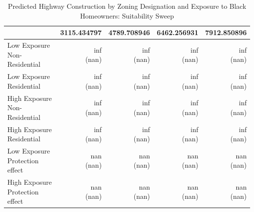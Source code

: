 \begin{table}[h]
\centering
\caption{Predicted Highway Construction by Zoning Designation and Exposure to Black Homeowners: Suitability Sweep}
\label{tab:predicted_outcomes_black_homeowners_sweep}
\begin{threeparttable}
\begin{tabular*}{0.6\textwidth}{@{\extracolsep{\fill}}l*{4}{r}}
\toprule
 & 3115.434797 & 4789.708946 & 6462.256931 & 7912.850896 \\
\midrule
Low Exposure Non-Residential & \makecell[tr]{inf \\ (nan)} & \makecell[tr]{inf \\ (nan)} & \makecell[tr]{inf \\ (nan)} & \makecell[tr]{inf \\ (nan)} \\
Low Exposure Residential & \makecell[tr]{inf \\ (nan)} & \makecell[tr]{inf \\ (nan)} & \makecell[tr]{inf \\ (nan)} & \makecell[tr]{inf \\ (nan)} \\
High Exposure Non-Residential & \makecell[tr]{inf \\ (nan)} & \makecell[tr]{inf \\ (nan)} & \makecell[tr]{inf \\ (nan)} & \makecell[tr]{inf \\ (nan)} \\
High Exposure Residential & \makecell[tr]{inf \\ (nan)} & \makecell[tr]{inf \\ (nan)} & \makecell[tr]{inf \\ (nan)} & \makecell[tr]{inf \\ (nan)} \\
Low Exposure Protection effect & \makecell[tr]{nan \\ (nan)} & \makecell[tr]{nan \\ (nan)} & \makecell[tr]{nan \\ (nan)} & \makecell[tr]{nan \\ (nan)} \\
High Exposure Protection effect & \makecell[tr]{nan \\ (nan)} & \makecell[tr]{nan \\ (nan)} & \makecell[tr]{nan \\ (nan)} & \makecell[tr]{nan \\ (nan)} \\

\end{tabular*}
\end{threeparttable}
\end{table}
